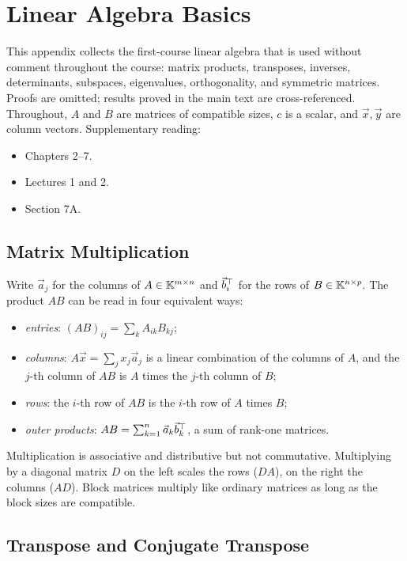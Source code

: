\chapter{Linear Algebra Basics}
\label{app:linalg}

This appendix collects the first-course linear algebra that is used without comment throughout the course: matrix products, transposes, inverses, determinants, subspaces, eigenvalues, orthogonality, and symmetric matrices. Proofs are omitted; results proved in the main text are cross-referenced. Throughout, $A$ and $B$ are matrices of compatible sizes, $c$ is a scalar, and $\vec{x}, \vec{y}$ are column vectors. Supplementary reading:
\begin{itemize}
  \item \cite{Lay} Chapters 2--7.
  \item \cite{TB} Lectures 1 and 2.
  \item \cite{Axler} Section 7A.
\end{itemize}

\section{Matrix Multiplication}
\label{sec:matmul}

Write $\vec{a}_j$ for the columns of $A \in \mathbb{K}^{m \times n}$ and $\vec{b}_i^\top$ for the rows of $B \in \mathbb{K}^{n \times p}$. The product $AB$ can be read in four equivalent ways:
\begin{itemize}
  \item \emph{entries}: $(AB)_{ij} = \sum_k A_{ik}B_{kj}$;
  \item \emph{columns}: $A\vec{x} = \sum_j x_j\vec{a}_j$ is a linear combination of the columns of $A$, and the $j$-th column of $AB$ is $A$ times the $j$-th column of $B$;
  \item \emph{rows}: the $i$-th row of $AB$ is the $i$-th row of $A$ times $B$;
  \item \emph{outer products}: $AB = \sum_{k=1}^{n} \vec{a}_k\vec{b}_k^\top$, a sum of rank-one matrices.
\end{itemize}
Multiplication is associative and distributive but not commutative. Multiplying by a diagonal matrix $D$ on the left scales the rows ($DA$), on the right the columns ($AD$). Block matrices multiply like ordinary matrices as long as the block sizes are compatible.

\section{Transpose and Conjugate Transpose}
\label{sec:transpose}

